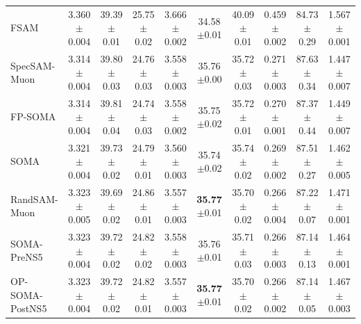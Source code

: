 \begin{table}[t]
{\begin{tabular}{lccccccccc}
    FSAM & 3.360{\scriptsize$\pm$0.004} & 39.39{\scriptsize$\pm$0.01} & 25.75{\scriptsize$\pm$0.02} & 3.666{\scriptsize$\pm$0.002} & 34.58{\scriptsize$\pm$0.01} & 40.09{\scriptsize$\pm$0.01} & 0.459{\scriptsize$\pm$0.002} & 84.73{\scriptsize$\pm$0.29} & 1.567{\scriptsize$\pm$0.001} \\
    SpecSAM-Muon & 3.314{\scriptsize$\pm$0.004} & 39.80{\scriptsize$\pm$0.03} & 24.76{\scriptsize$\pm$0.03} & 3.558{\scriptsize$\pm$0.003} & 35.76{\scriptsize$\pm$0.00} & 35.72{\scriptsize$\pm$0.03} & 0.271{\scriptsize$\pm$0.003} & 87.63{\scriptsize$\pm$0.34} & 1.447{\scriptsize$\pm$0.007} \\
    FP-SOMA & 3.314{\scriptsize$\pm$0.004} & 39.81{\scriptsize$\pm$0.04} & 24.74{\scriptsize$\pm$0.03} & 3.558{\scriptsize$\pm$0.002} & 35.75{\scriptsize$\pm$0.02} & 35.72{\scriptsize$\pm$0.01} & 0.270{\scriptsize$\pm$0.001} & 87.37{\scriptsize$\pm$0.44} & 1.449{\scriptsize$\pm$0.007} \\
    SOMA & 3.321{\scriptsize$\pm$0.004} & 39.73{\scriptsize$\pm$0.02} & 24.79{\scriptsize$\pm$0.01} & 3.560{\scriptsize$\pm$0.003} & 35.74{\scriptsize$\pm$0.02} & 35.74{\scriptsize$\pm$0.02} & 0.269{\scriptsize$\pm$0.002} & 87.51{\scriptsize$\pm$0.27} & 1.462{\scriptsize$\pm$0.005} \\
    RandSAM-Muon & 3.323{\scriptsize$\pm$0.005} & 39.69{\scriptsize$\pm$0.02} & 24.86{\scriptsize$\pm$0.01} & 3.557{\scriptsize$\pm$0.003} & \textbf{35.77}{\scriptsize$\pm$0.01} & 35.70{\scriptsize$\pm$0.02} & 0.266{\scriptsize$\pm$0.004} & 87.22{\scriptsize$\pm$0.07} & 1.471{\scriptsize$\pm$0.001} \\
    SOMA-PreNS5 & 3.323{\scriptsize$\pm$0.004} & 39.72{\scriptsize$\pm$0.02} & 24.82{\scriptsize$\pm$0.02} & 3.558{\scriptsize$\pm$0.003} & 35.76{\scriptsize$\pm$0.01} & 35.71{\scriptsize$\pm$0.03} & 0.266{\scriptsize$\pm$0.003} & 87.14{\scriptsize$\pm$0.13} & 1.464{\scriptsize$\pm$0.001} \\
    OP-SOMA-PostNS5 & 3.323{\scriptsize$\pm$0.004} & 39.72{\scriptsize$\pm$0.02} & 24.82{\scriptsize$\pm$0.01} & 3.557{\scriptsize$\pm$0.003} & \textbf{35.77}{\scriptsize$\pm$0.01} & 35.70{\scriptsize$\pm$0.02} & 0.266{\scriptsize$\pm$0.002} & 87.14{\scriptsize$\pm$0.05} & 1.467{\scriptsize$\pm$0.003} \\
    \bottomrule
  \end{tabular}}
\end{table}
